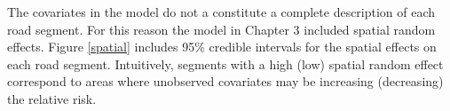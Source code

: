 \begin{table}[tb]

\end{table} 

The covariates in the model do not a constitute a complete description of each road segment. For this reason the model in Chapter 3 included spatial random effects. Figure \ref{spatial} includes 95\% credible intervals for the spatial effects on each road segment.  Intuitively, segments with a high (low) spatial random effect correspond to areas where unobserved covariates may be increasing (decreasing) the relative risk.

